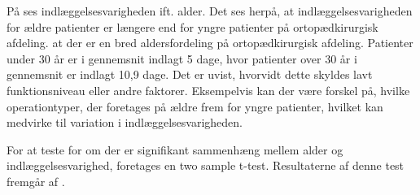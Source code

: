 \noindent
På  ses indlæggelsesvarigheden ift. alder. Det ses herpå, at indlæggelsesvarigheden for ældre patienter er længere end for yngre patienter på ortopædkirurgisk afdeling.  at der er en bred aldersfordeling på ortopædkirurgisk afdeling. Patienter under $30$ år er i gennemsnit indlagt 5 dage, hvor patienter over $30$ år i gennemsnit er indlagt 10,9 dage. Det er uvist, hvorvidt dette skyldes lavt funktionsniveau eller andre faktorer. Eksempelvis kan der være forskel på, hvilke operationtyper, der foretages på ældre frem for yngre patienter, hvilket kan medvirke til variation i indlæggelsesvarigheden.

For at teste for om der er signifikant sammenhæng mellem alder og indlæggelsesvarighed, foretages en two sample t-test. Resultaterne af denne test fremgår af .


